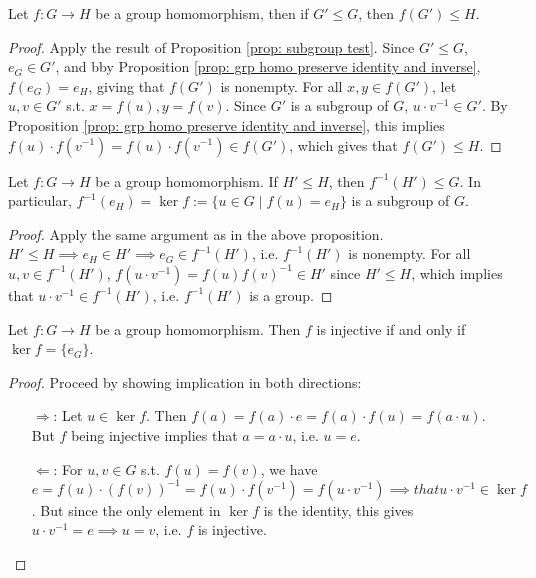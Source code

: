 \documentclass{article}
\begin{document}
\begin{proposition}
    Let $f: G \to H$ be a group homomorphism, then if $G' \leq G$, then $f(G') \leq H$.
\end{proposition}

\begin{proof}
    Apply the result of Proposition \ref{prop: subgroup test}. Since $G' \leq G$, $e_G \in G'$, and bby Proposition \ref{prop: grp homo preserve identity and inverse}, $f(e_G) = e_H$, giving that $f(G')$ is nonempty. For all $x, y \in f(G')$, let $u, v \in G'$ s.t. $x = f(u), y = f(v)$. Since $G'$ is a subgroup of $G$, $u\cdot v^{-1} \in G'$. By Proposition \ref{prop: grp homo preserve identity and inverse}, this implies $f(u) \cdot f(v^{-1}) = f(u) \cdot f(v^{-1}) \in f(G')$, which gives that $f(G') \leq H$.
\end{proof}

\begin{proposition}\label{prop: kernel gives a subgroup}
    Let $f: G \to H$ be a group homomorphism. If $H' \leq H$, then $f^{-1} (H') \leq G$. In particular, $f^{-1}(e_H) = \ker f := \{u \in G \mid f(u) = e_H\}$ is a subgroup of $G$.
\end{proposition}

\begin{proof}
    Apply the same argument as in the above proposition. $H' \leq H \implies e_H \in H' \implies e_G \in f^{-1}(H')$, i.e. $f^{-1}(H')$ is nonempty. For all $u, v \in f^{-1}(H')$, $f(u\cdot v^{-1}) = f(u) f(v)^{-1} \in H'$ since $H' \leq H$, which implies that $u \cdot v^{-1} \in f^{-1}(H')$, i.e. $f^{-1}(H')$ is a group. 
\end{proof}

\begin{proposition}
    Let $f: G \to H$ be a group homomorphism. Then $f$ is injective if and only if $\ker f = \{e_G\}$.
\end{proposition}

\begin{proof}
    Proceed by showing implication in both directions:
    \begin{enumerate}
        \item[$\Rightarrow$:] Let $u \in \ker f$. Then $f(a) = f(a) \cdot e = f(a) \cdot f(u) = f(a \cdot u)$. But $f$ being injective implies that $a = a\cdot u$, i.e. $u = e$.
        \item[$\Leftarrow$:] For $u, v \in G$ s.t. $f(u) = f(v)$, we have $e = f(u) \cdot (f(v))^{-1} = f(u) \cdot f(v^{-1}) = f(u \cdot v^{-1}) \implies that u \cdot v^{-1} \in \ker f$. But since the only element in $\ker f$ is the identity, this gives $u \cdot v^{-1} = e \implies u = v$, i.e. $f$ is injective.
    \end{enumerate}
\end{proof}
\end{document}
